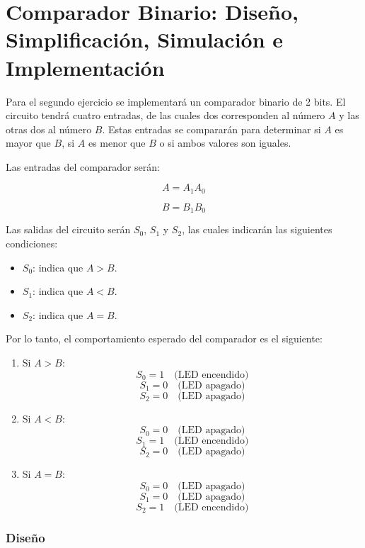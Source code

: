 \documentclass[a4paper,12pt]{article}
\begin{document}
	

	\section{Comparador Binario: Diseño, Simplificación, Simulación e Implementación}
	
	Para el segundo ejercicio se implementará un comparador binario de 2 bits. 
	El circuito tendrá cuatro entradas, de las cuales dos corresponden al número $A$ 
	y las otras dos al número $B$. Estas entradas se compararán para determinar 
	si $A$ es mayor que $B$, si $A$ es menor que $B$ o si ambos valores son iguales.
	
	Las entradas del comparador serán:
	
	\[
	A = A_1A_0
	\]
	
	\[
	B = B_1B_0
	\]
	
	Las salidas del circuito serán $S_0$, $S_1$ y $S_2$, las cuales indicarán las siguientes condiciones:
	
	\begin{itemize}
		\item $S_0$: indica que $A > B$.
		\item $S_1$: indica que $A < B$.
		\item $S_2$: indica que $A = B$.
	\end{itemize}
	
	Por lo tanto, el comportamiento esperado del comparador es el siguiente:
	
	\begin{enumerate}
		\item Si $A > B$:
		\[
		S_0 = 1 \quad \text{(LED encendido)}
		\]
		\[
		S_1 = 0 \quad \text{(LED apagado)}
		\]
		\[
		S_2 = 0 \quad \text{(LED apagado)}
		\]
		
		\item Si $A < B$:
		\[
		S_0 = 0 \quad \text{(LED apagado)}
		\]
		\[
		S_1 = 1 \quad \text{(LED encendido)}
		\]
		\[
		S_2 = 0 \quad \text{(LED apagado)}
		\]
		
		\item Si $A = B$:
		\[
		S_0 = 0 \quad \text{(LED apagado)}
		\]
		\[
		S_1 = 0 \quad \text{(LED apagado)}
		\]
		\[
		S_2 = 1 \quad \text{(LED encendido)}
		\]
	\end{enumerate}
	
	\subsubsection{Diseño}
	
\end{document}
